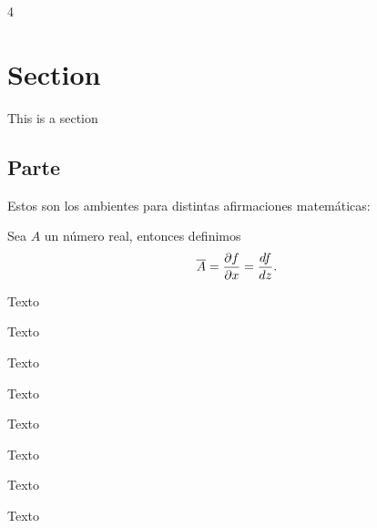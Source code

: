 \documentclass[landscape, letterpaper]{article}
\def\cols{4}
\begin{document}
\setlength{\columnseprule}{0.4pt} %
\footnotesize
\begin{multicols*}{\cols} %


\section{Section}

    This is a section

\subsection{Parte}

Estos son los ambientes para distintas afirmaciones matemáticas:

\begin{defi} Sea $A$ un número real, entonces definimos
\begin{align*}
    \overline{A} = \frac{\partial f}{\partial x} = \frac{d f}{d z}.
\end{align*}

\end{defi}

\begin{propo}
    Texto
\end{propo}

\begin{coro}
    Texto
\end{coro}

\begin{thm}
    Texto
\end{thm}

\begin{lem}
    Texto
\end{lem}

\begin{obs}
    Texto
\end{obs}

\begin{rem}
    Texto
\end{rem}

\begin{hecho}
    Texto
\end{hecho}

\begin{datazo}
    Texto
\end{datazo}



\end{multicols*}
\end{document}
